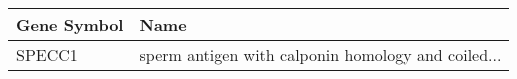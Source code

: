 \begin{tabular}{ll}
\toprule
Gene Symbol &                                               Name \\
\midrule
     SPECC1 & sperm antigen with calponin homology and coiled... \\
\bottomrule
\end{tabular}
